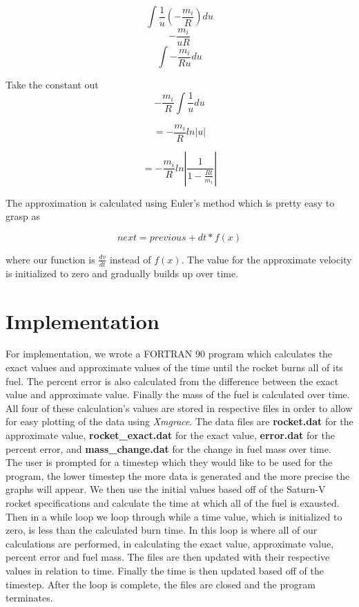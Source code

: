 \documentclass[11pt]{article}
\begin{document}
\begin{equation}
\int{\frac{1}{u}(-\frac{m_i}{R})du}
\end{equation}
\begin{equation}
- \frac{m_i}{uR}
\end{equation}
\begin{equation}
\int{-\frac{m_i}{Ru} du}
\end{equation}

Take the constant out
\begin{equation}
-\frac{m_i}{R} \int{\frac{1}{u}du}
\end{equation}

\begin{equation}
= -\frac{m_i}{R}ln|u|
\end{equation}

\begin{equation}
= -\frac{m_i}{R}ln|\frac{1}{1-\frac{Rt}{m_i}}|
\end{equation}

The approximation is calculated using Euler's method which is pretty easy to grasp as

\begin{equation}
next = previous + dt * f(x)
\end{equation}

\noindent where our function is $\frac{dv}{dt}$ instead of $f(x)$. The value for the approximate velocity is initialized to zero and gradually builds up over time.


\section{Implementation}
For implementation, we wrote a FORTRAN 90 program which calculates the exact values and approximate values of the time until the rocket burns all of its fuel. The percent error is also calculated from the difference between the exact value and approximate value. Finally the mass of the fuel is calculated over time. All four of these calculation's values are stored in respective files in order to allow for easy plotting of the data using \textit{Xmgrace}. The data files are \textbf{rocket.dat} for the approximate value, \textbf{rocket\_exact.dat} for the exact value, \textbf{error.dat} for the percent error, and \textbf{mass\_change.dat} for the change in fuel mass over time.\\

The user is prompted for a timestep which they would like to be used for the program, the lower timestep the more data is generated and the more precise the graphs will appear. We then use the initial values based off of the Saturn-V rocket specifications and calculate the time at which all of the fuel is exausted. Then in a while loop we loop through while a time value, which is initialized to zero, is less than the calculated burn time. In this loop is where all of our calculations are performed, in calculating the exact value, approximate value, percent error and fuel mass. The files are then updated with their respective values in relation to time. Finally the time is then updated based off of the timestep. After the loop is complete, the files are closed and the program terminates.
\end{document}
